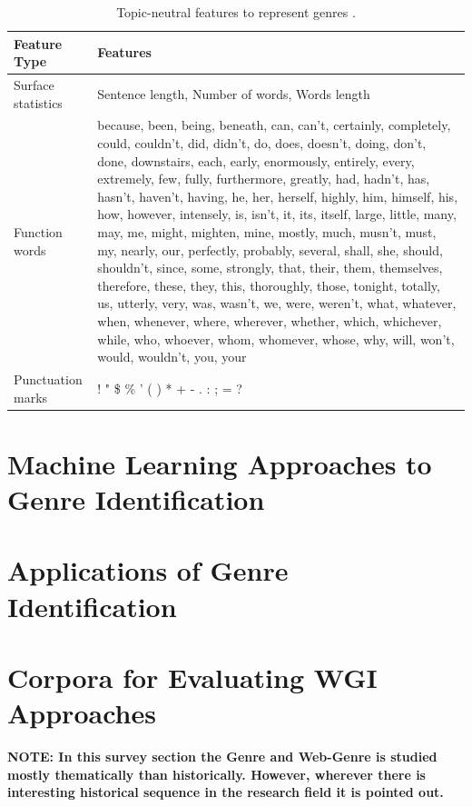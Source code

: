 \begin{table}[t]
	\center
	\caption {Topic-neutral features to represent genres \parencite{finn2006learning}.}\label{chap:relevant_work:tbl:domain_trans_text_statistics}
	\begin{tabular}{p{3cm}|p{11cm}}
		\hline
		Feature Type & Features\\
		\hline
		 Surface statistics & Sentence length, Number of words, Words length \\
         Function words & because, been, being, beneath, can, can’t, certainly, completely, could, couldn’t, did, didn’t, do, does, doesn’t, doing, don’t, done, downstairs, each, early, enormously, entirely, every, extremely, few, fully, furthermore, greatly, had, hadn’t, has, hasn’t, haven’t, having, he, her, herself, highly, him, himself, his, how, however, intensely, is, isn’t, it, its, itself, large, little, many, may, me, might, mighten, mine, mostly, much, musn’t, must, my, nearly, our, perfectly, probably, several, shall, she, should, shouldn’t, since, some, strongly, that, their, them, themselves, therefore, these, they, this, thoroughly, those, tonight, totally, us, utterly, very, was, wasn’t, we, were, weren’t, what, whatever, when, whenever, where, wherever, whether, which, whichever, while, who, whoever, whom, whomever, whose, why, will, won’t, would, wouldn’t, you, your \\
         Punctuation marks  & ! " \$ \% ' ( ) * + - . : ; = ? \\
  		\hline
	\end{tabular}
\end{table}

\section{Machine Learning Approaches to Genre Identification}
\section{Applications of Genre Identification}
\section{Corpora for Evaluating WGI Approaches}

\textbf{NOTE: In this survey section the Genre and Web-Genre is studied mostly thematically than historically. However, wherever there is interesting historical sequence in the research field it is pointed out.}

